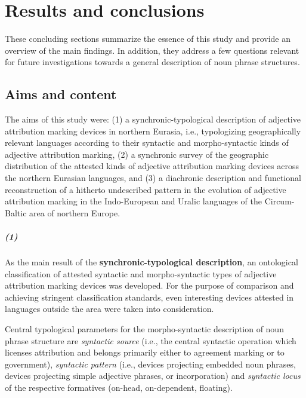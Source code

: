 
\chapter{Results and conclusions}
These concluding sections summarize the essence of this study and provide an overview of the main findings. In addition, they address a few questions relevant for future investigations towards a general description of noun phrase structures.

\section{Aims and content}
The aims of this study were: (1) a synchronic-typological description of adjective attribution marking devices in northern Eurasia, i.e., typologizing geographically relevant languages according to their syntactic and morpho-syntactic kinds of adjective attribution marking, (2) a synchronic survey of the geographic distribution of the attested kinds of adjective attribution marking devices across the northern Eurasian languages, and (3) a diachronic description and functional reconstruction of a hitherto undescribed pattern in the evolution of adjective attribution marking in the Indo-European and Uralic languages of the Circum-Baltic area of northern Europe.

\paragraph*{(1)}
As the main result of the \textbf{synchronic-typological description}, an ontological classification of attested syntactic and morpho-syntactic types of adjective attribution marking devices was developed. For the purpose of comparison and achieving stringent classification standards, even interesting devices attested in languages outside the area were taken into consideration. 

Central typological parameters for the morpho-syntactic description of noun phrase structure are \textit{syntactic source} (i.e., the central syntactic operation which licenses attribution and belongs primarily either to agreement marking or to government), \textit{syntactic pattern} (i.e., devices projecting embedded noun phrases, devices projecting simple adjective phrases, or incorporation) and \textit{syntactic locus} of the respective formatives (on-head, on-dependent, floating).

